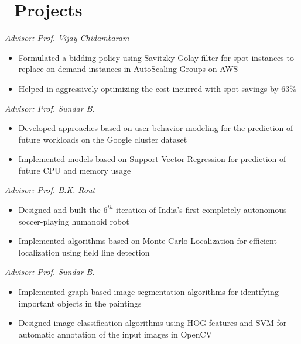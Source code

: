 \documentclass{resume}
\begin{document}
\section{\faCodeFork\ Projects}
\textit{Advisor: Prof. Vijay Chidambaram} \hfill
\begin{itemize}
	\item Formulated a bidding policy using Savitzky-Golay filter for spot instances to replace on-demand instances in AutoScaling Groups on AWS
	\item Helped in aggressively optimizing the cost incurred with spot savings by 63\%
\end{itemize}

\textit{Advisor: Prof. Sundar B.} \hfill
\begin{itemize}
  \item Developed approaches based on user behavior modeling for the prediction of future workloads on the Google cluster dataset
  \item Implemented models based on Support Vector Regression for prediction of future CPU and memory usage
\end{itemize}

\textit{Advisor: Prof. B.K. Rout} \hfill
\begin{itemize}
	\item Designed and built the $6^{th}$ iteration of India's first completely autonomous soccer-playing humanoid robot
	\item Implemented algorithms based on Monte Carlo Localization for efficient localization using field line detection
\end{itemize}

\textit{Advisor: Prof. Sundar B.} \hfill
\begin{itemize}
	\item Implemented graph-based image segmentation algorithms for identifying important objects in the paintings
	\item Designed image classification algorithms using HOG features and SVM for automatic annotation of the input images in OpenCV
\end{itemize}
\end{document}
